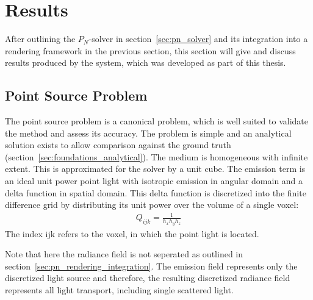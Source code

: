 \section{Results}
\label{sec:pn_results}

After outlining the $P_N$-solver in section~\ref{sec:pn_solver} and its integration into a rendering framework in the previous section, this section will give and discuss results produced by the system, which was developed as part of this thesis.

\subsection{Point Source Problem}
\label{sec:pn_results_pointsource}

The point source problem is a canonical problem, which is well suited to validate the method and assess its accuracy. The problem is simple and an analytical solution exists to allow comparison against the ground truth (section~\ref{sec:foundations_analytical}). The medium is homogeneous with infinite extent. This is approximated for the solver by a unit cube. The emission term is an ideal unit power point light with isotropic emission in angular domain and a delta function in spatial domain. This delta function is discretized into the finite difference grid by distributing its unit power over the volume of a single voxel:
\begin{align}
Q_{ijk} = \frac{1}{h_xh_yh_z}
\end{align}
The index {ijk} refers to the voxel, in which the point light is located.

Note that here the radiance field is not seperated as outlined in section~\ref{sec:pn_rendering_integration}. The emission field represents only the discretized light source and therefore, the resulting discretized radiance field represents all light transport, including single scattered light.

